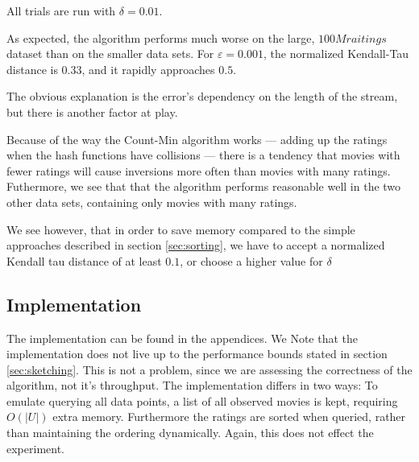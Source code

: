 \pgfplotsset{scaled x ticks=false}
\begin{center}
\end{center}

All trials are run with $\delta = 0.01$.

As expected, the algorithm performs much worse on the large, $100M raitings$
dataset than on the smaller data sets.
For $\varepsilon = 0.001$, the normalized Kendall-Tau distance is $0.33$, and it
rapidly approaches $0.5$.

The obvious explanation is the error's dependency on the length of the stream,
but there is another factor at play.

Because of the way the Count-Min algorithm works --- adding up the ratings when the
hash functions have collisions --- there is a tendency that movies with fewer
ratings will cause inversions more often than movies with many ratings.
Futhermore, we see that that the algorithm performs reasonable well in the two
other data sets, containing only movies with many ratings.

We see however, that in order to save memory compared to the simple
approaches described in section \ref{sec:sorting}, we have to accept a
normalized Kendall tau distance of at least $0.1$, or choose a higher value for $\delta$

\subsection{Implementation}
The implementation can be found in the appendices.
We Note that the implementation does not live up to the performance
bounds stated in section \ref{sec:sketching}. This is not a problem, since we
are assessing the correctness of the algorithm, not it's throughput. The
implementation differs in two ways: To emulate querying all data points, a list
of all observed movies is kept, requiring $O(|U|)$ extra memory. Furthermore the
ratings are sorted when queried, rather than maintaining the ordering
dynamically. Again, this does not effect the experiment.
